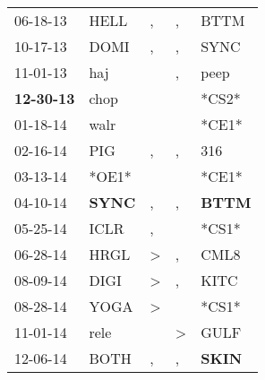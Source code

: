 \begin{supertabular}{p{0.07\textwidth}p{0.06\textwidth}p{0.02\textwidth}p{0.02\textwidth}p{0.06\textwidth}}
          06-18-13\textsuperscript{} &           HELL\textsuperscript{} &                , &                , &           BTTM\textsuperscript{} \\
          10-17-13\textsuperscript{} &           DOMI\textsuperscript{} &                , &                , &           SYNC\textsuperscript{} \\
          11-01-13\textsuperscript{} &            haj\textsuperscript{} &                  &                , &           peep\textsuperscript{} \\
 \textbf{12-30-13\textsuperscript{}} &           chop\textsuperscript{} &                  &                  &                            *CS2* \\
          01-18-14\textsuperscript{} &           walr\textsuperscript{} &                  &                  &                            *CE1* \\
          02-16-14\textsuperscript{} &            PIG\textsuperscript{} &                , &                , &            316\textsuperscript{} \\
          03-13-14\textsuperscript{} &                            *OE1* &                  &                  &                            *CE1* \\
          04-10-14\textsuperscript{} &  \textbf{SYNC\textsuperscript{}} &                , &                , &  \textbf{BTTM\textsuperscript{}} \\
          05-25-14\textsuperscript{} &           ICLR\textsuperscript{} &                , &                  &                            *CS1* \\
          06-28-14\textsuperscript{} &           HRGL\textsuperscript{} &     \textgreater &                , &           CML8\textsuperscript{} \\
          08-09-14\textsuperscript{} &           DIGI\textsuperscript{} &     \textgreater &                , &           KITC\textsuperscript{} \\
          08-28-14\textsuperscript{} &           YOGA\textsuperscript{} &     \textgreater &                  &                            *CS1* \\
          11-01-14\textsuperscript{} &           rele\textsuperscript{} &                  &     \textgreater &           GULF\textsuperscript{} \\
          12-06-14\textsuperscript{} &           BOTH\textsuperscript{} &                , &                , &  \textbf{SKIN\textsuperscript{}} \\

\end{supertabular}
